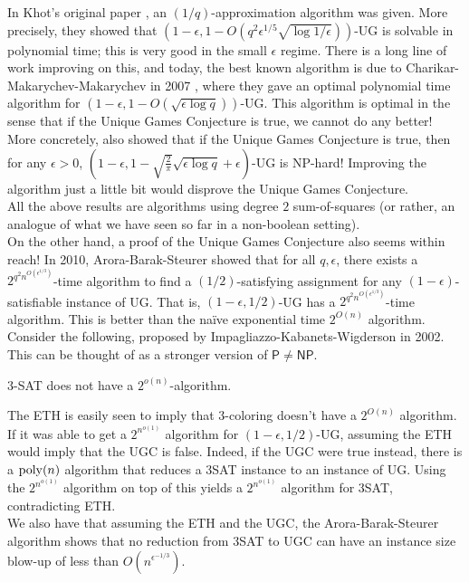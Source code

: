 		In Khot's original paper \cite{ugc-og}, an $(1/q)$-approximation algorithm was given. More precisely, they showed that $(1-\epsilon,1 - O(q^2\epsilon^{1/5}\sqrt{\log 1/\epsilon}))$-UG is solvable in polynomial time; this is very good in the small $\epsilon$ regime. There is a long line of work improving on this, and today, the best known algorithm is due to Charikar-Makarychev-Makarychev in 2007 \cite{ug-optimal-algo}, where they gave an optimal polynomial time algorithm for $(1-\epsilon,1-O(\sqrt{\epsilon \log q}))$-UG. This algorithm is optimal in the sense that if the Unique Games Conjecture is true, we cannot do any better! More concretely, \cite{max-cut-ugc} also showed that if the Unique Games Conjecture is true, then for any $\epsilon > 0$, $(1-\epsilon,1 - \sqrt{\frac{2}{\pi}}\sqrt{\epsilon \log q} + \epsilon)$-UG is \textsf{NP}-hard! Improving the \cite{ug-optimal-algo} algorithm just a little bit would disprove the Unique Games Conjecture.\\
		All the above results are algorithms using degree $2$ sum-of-squares (or rather, an analogue of what we have seen so far in a non-boolean setting).\\

		On the other hand, a proof of the Unique Games Conjecture also seems within reach!
		In 2010, Arora-Barak-Steurer \cite{subexp-ug} showed that for all $q,\epsilon$, there exists a $2^{q^2n^{O(\epsilon^{1/3})}}$-time algorithm to find a $(1/2)$-satisfying assignment for any $(1-\epsilon)$-satisfiable instance of UG. That is, $(1-\epsilon,1/2)$-UG has a $2^{q^2 n^{O(\epsilon^{1/3})}}$-time algorithm. This is better than the na\"{i}ve exponential time $2^{O(n)}$ algorithm.\\
		Consider the following, proposed by Impagliazzo-Kabanets-Wigderson \cite{eth} in 2002. This can be thought of as a stronger version of $\mathsf{P} \ne \mathsf{NP}$.

		\begin{fcon}
			$3$-SAT does not have a $2^{o(n)}$-algorithm.
		\end{fcon}
		The ETH is easily seen to imply that $3$-coloring doesn't have a $2^{O(n)}$ algorithm. If it was able to get a $2^{n^{o(1)}}$ algorithm for $(1-\epsilon,1/2)$-UG, assuming the ETH would imply that the UGC is false. Indeed, if the UGC were true instead, there is a $\operatorname{poly}(n)$ algorithm that reduces a 3\textsf{SAT} instance to an instance of UG. Using the $2^{n^{o(1)}}$ algorithm on top of this yields a $2^{n^{o(1)}}$ algorithm for 3\textsf{SAT}, contradicting ETH.\\
		We also have that assuming the ETH and the UGC, the Arora-Barak-Steurer algorithm shows that no reduction from 3\textsf{SAT} to UGC can have an instance size blow-up of less than $O(n^{\epsilon^{-1/3}})$.

